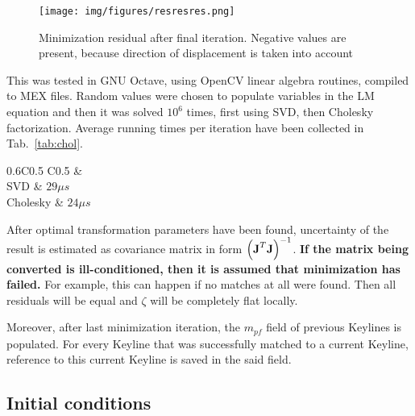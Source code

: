 \begin{figure}[ht]
	\centering\texttt{[image: img/figures/resresres.png]}
	\caption{ Minimization residual after final iteration. Negative values are present, because direction of displacement is taken into account }
	\label{fig:minim_res}
\end{figure}

This was tested in GNU Octave, using OpenCV \cite{opencv} linear algebra routines, compiled to MEX files. Random values were chosen to populate variables in the LM equation and then it was solved $10^6$ times, first using SVD, then Cholesky factorization. Average running times per iteration have been collected in Tab.~\ref{tab:chol}.

\begin{table}[ht]
	\centering
	
	\begin{threeparttable}
		\caption{SVD and Cholesky running time comparison}
		\label{tab:chol}
		
		\begin{tabularx}{0.6\textwidth}{C{0.5} C{0.5}}
			\toprule
			 &  \\
			\midrule
			SVD & $29 \mu s$ \\
			Cholesky & $24 \mu s$ \\
			\bottomrule
		\end{tabularx}
		
	\end{threeparttable}
\end{table}


After optimal transformation parameters have been found, uncertainty of the result is estimated as covariance matrix in form $\left( \textbf{J}^T \textbf{J} \right) ^ {-1}$. \textbf{If the matrix being converted is ill-conditioned, then it is assumed that minimization has failed.} For example, this can happen if no matches at all were found. Then all residuals will be equal and $\zeta$ will be completely flat locally.

Moreover, after last minimization iteration, the $m_{pf}$ field of previous Keylines is populated. For every Keyline that was successfully matched to a current Keyline, reference to this current Keyline is saved in the said field.

\subsection{Initial conditions}

